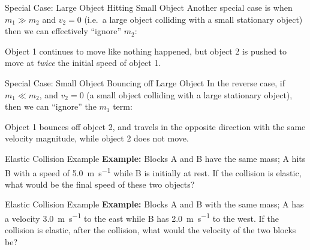 \documentclass[12pt,compress,aspectratio=169]{beamer}
\begin{document}
\begin{frame}{Special Case: Large Object Hitting Small Object}
  Another special case is when $m_1\gg m_2$ and $v_2=0$ (i.e.\ a large object
  colliding with a small stationary object) then we can effectively ``ignore''
  $m_2$:
  

  Object 1 continues to move like nothing happened, but object 2 is pushed to
  move at \emph{twice} the initial speed of object 1.
\end{frame}



\begin{frame}{Special Case: Small Object Bouncing off Large Object}
  In the reverse case, if $m_1\ll m_2$, and $v_2=0$ (a small object colliding
  with a large stationary object), then we can ``ignore'' the $m_1$ term:
  

  Object 1 bounces off object 2, and travels in the opposite direction with the
  same velocity magnitude, while object 2 does not move.
\end{frame}



\begin{frame}{Elastic Collision Example}
  \textbf{Example:} Blocks A and B have the same mass; A hits B with a speed
  of \SI{5.0}{\metre\per\second} while B is initially at rest. If the collision
  is elastic, what would be the final speed of these two objects?
\end{frame}



\begin{frame}{Elastic Collision Example}
  \textbf{Example:} Blocks A and B with the same mass; A has a velocity
  \SI{3.0}{\metre\per\second} to the east while B has
  \SI{2.0}{\metre\per\second} to the west. If the collision is elastic, after
  the collision, what would the velocity of the two blocks be?
\end{frame}
\end{document}
